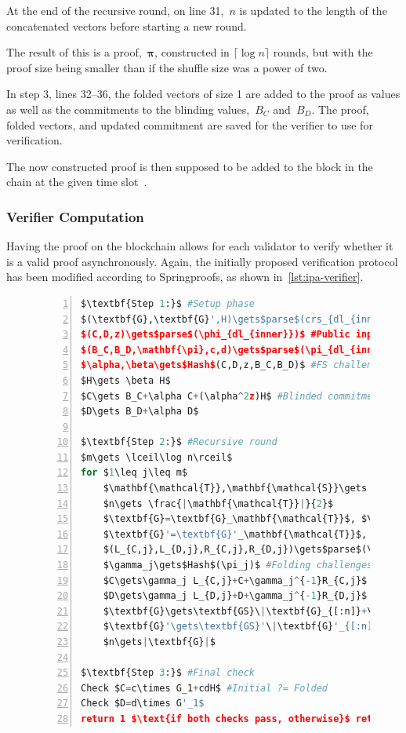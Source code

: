 At the end of the recursive round, on line 31,~$n$ is updated to the length of the concatenated vectors before starting a new round.

The result of this is a proof,~$\mathbf{\pi}$, constructed in $\lceil \log n \rceil$ rounds, but with the proof size being smaller than if the shuffle size was a power of two.

In step 3, lines 32--36, the folded vectors of size 1 are added to the proof as values as well as the commitments to the blinding values,~$B_C$ and~$B_D$.
The proof, folded vectors, and updated commitment are saved for the verifier to use for verification.


The now constructed proof is then supposed to be added to the block in the chain at the given time slot~\cite{Whisk2024}.

\subsubsection*{Verifier Computation}
Having the proof on the blockchain allows for each validator to verify whether it is a valid proof asynchronously.
Again, the initially proposed verification protocol has been modified according to Springproofs, as shown in~\autoref{lst:ipa-verifier}.

\begin{figure}[!htb]
\begin{lstlisting}[language=Python,mathescape=true,label={lst:ipa-verifier},numbers=left,caption={Verifier computation for CAAU-IPA in CAAUrdleproofs},captionpos=b,frame=single]
$\textbf{Step 1:}$ #Setup phase
$(\textbf{G},\textbf{G}',H)\gets$parse$(crs_{dl_{inner}})$
$(C,D,z)\gets$parse$(\phi_{dl_{inner}})$ #Public input
$(B_C,B_D,\mathbf{\pi},c,d)\gets$parse$(\pi_{dl_{inner}})$ #From prover
$\alpha,\beta\gets$Hash$(C,D,z,B_C,B_D)$ #FS challenges
$H\gets \beta H$
$C\gets B_C+\alpha C+(\alpha^2z)H$ #Blinded commitments
$D\gets B_D+\alpha D$

$\textbf{Step 2:}$ #Recursive round
$m\gets \lceil\log n\rceil$
for $1\leq j\leq m$
    $\mathbf{\mathcal{T}},\mathbf{\mathcal{S}}\gets \textbf{\textit{f(}}n\textbf{\textit{)}}$ #Scheme function
    $n\gets \frac{|\mathbf{\mathcal{T}}|}{2}$
    $\textbf{G}=\textbf{G}_\mathbf{\mathcal{T}}$, $\textbf{GS}=\textbf{G}_\mathbf{\mathcal{S}}$ #Vector splitting
    $\textbf{G}'=\textbf{G}'_\mathbf{\mathcal{T}}$, $\textbf{GS}'=\textbf{G}'_\mathbf{\mathcal{S}}$
    $(L_{C,j},L_{D,j},R_{C,j},R_{D,j})\gets$parse$(\pi_j)$ #Proof elem
    $\gamma_j\gets$Hash$(\pi_j)$ #Folding challenges
    $C\gets\gamma_j L_{C,j}+C+\gamma_j^{-1}R_{C,j}$ #Update comms
    $D\gets\gamma_j L_{D,j}+D+\gamma_j^{-1}R_{D,j}$
    $\textbf{G}\gets\textbf{GS}\|\textbf{G}_{[:n]}+\gamma_j\textbf{G}_{[n:]}$ #Next round vectors
    $\textbf{G}'\gets\textbf{GS}'\|\textbf{G}'_{[:n]}+\gamma_j^{-1}\textbf{G}'_{[n:]}$
    $n\gets|\textbf{G}|$

$\textbf{Step 3:}$ #Final check
Check $C=c\times G_1+cdH$ #Initial ?= Folded
Check $D=d\times G'_1$
return 1 $\text{if both checks pass, otherwise}$ return 0
\end{lstlisting}
\label{fig:ipa-verifier}
\end{figure}

